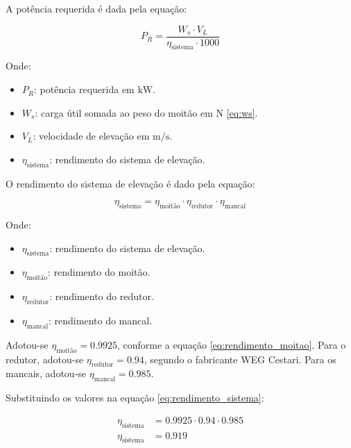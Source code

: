 A potência requerida é dada pela equação:

\begin{equation}
  P_R = \frac{W_s \cdot V_L}{\eta_{\text{sistema}} \cdot 1000}
  \label{eq:potencia_requerida}
\end{equation}

Onde:

\begin{itemize}[leftmargin=1.25cm]
  \item $P_R$: potência requerida em $\si{\kilo\watt}$.
  \item $W_s$: carga útil somada ao peso do moitão em $\si{\newton}$ \eqref{eq:ws}.
  \item $V_L$: velocidade de elevação em $\si{\meter\per\second}$.
  \item $\eta_{\text{sistema}}$: rendimento do sistema de elevação.
\end{itemize}

\vspace{1em}

O rendimento do sistema de elevação é dado pela equação:

\begin{equation}
  \eta_{\text{sistema}} = \eta_{\text{moitão}} \cdot \eta_{\text{redutor}} \cdot \eta_{\text{mancal}}
  \label{eq:rendimento_sistema}
\end{equation}

Onde:

\begin{itemize}[leftmargin=1.25cm]
  \item $\eta_{\text{sistema}}$: rendimento do sistema de elevação.
  \item $\eta_{\text{moitão}}$: rendimento do moitão.
  \item $\eta_{\text{redutor}}$: rendimento do redutor.
  \item $\eta_{\text{mancal}}$: rendimento do mancal.
\end{itemize}

\vspace{1em}

Adotou-se $\eta_{\text{moitão}} = \num{0.9925}$, conforme a equação \eqref{eq:rendimento_moitao}. Para o redutor, adotou-se $\eta_{\text{redutor}} = \num{0.94}$, segundo o fabricante WEG Cestari. Para os mancais, adotou-se $\eta_{\text{mancal}} = \num{0.985}$.

Substituindo os valores na equação \eqref{eq:rendimento_sistema}:

\begin{align*}
  \eta_{\text{sistema}} & = \num{0.9925} \cdot \num{0.94} \cdot \num{0.985} \\
  \eta_{\text{sistema}} & = \boxed{\num{0.919}}
\end{align*}

